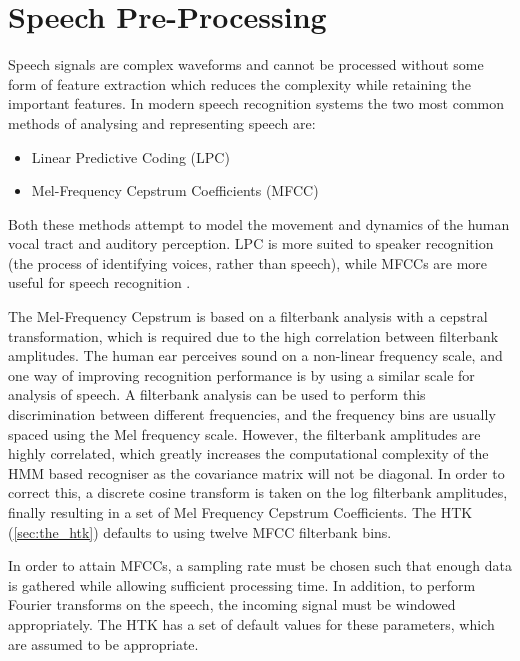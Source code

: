 

\section{Speech Pre-Processing} %
\label{sec:speech_pre_processing}
Speech signals are complex waveforms and cannot be processed without some form of feature extraction which reduces the complexity while retaining the important features.  In modern speech recognition systems the two most common methods of analysing and representing speech are: \cite{gaikwad2010review}
\begin{itemize}
	\item Linear Predictive Coding (LPC)
	\item Mel-Frequency Cepstrum Coefficients (MFCC)
\end{itemize}
Both these methods attempt to model the movement and dynamics of the human vocal tract and auditory perception.  LPC is more suited to speaker recognition (the process of identifying voices, rather than speech), while MFCCs are more useful for speech recognition \cite{sd2012interview}.

The Mel-Frequency Cepstrum is based on a filterbank analysis with a cepstral transformation, which is required due to the high correlation between filterbank amplitudes.  The human ear perceives sound on a non-linear frequency scale, and one way of improving recognition performance is by using a similar scale for analysis of speech.  A filterbank analysis can be used to perform this discrimination between different frequencies, and the frequency bins are usually spaced using the Mel frequency scale.  However, the filterbank amplitudes are highly correlated, which greatly increases the computational complexity of the HMM based recogniser as the covariance matrix will not be diagonal.  In order to correct this, a discrete cosine transform is taken on the log filterbank amplitudes, finally resulting in a set of Mel Frequency Cepstrum Coefficients.  The HTK (\ref{sec:the_htk}) defaults to using twelve MFCC filterbank bins. \cite{htkbook} \cite{melnikoff2003speech}

In order to attain MFCCs, a sampling rate must be chosen such that enough data is gathered while allowing sufficient processing time.  In addition, to perform Fourier transforms on the speech, the incoming signal must be windowed appropriately.  The HTK has a set of default values for these parameters, which are assumed to be appropriate.

